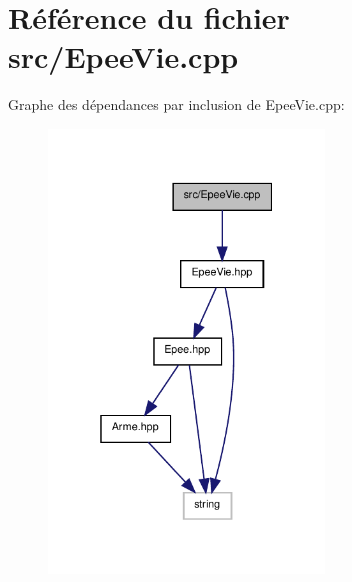 \section{Référence du fichier src/\-Epee\-Vie.cpp}
\label{_epee_vie_8cpp}
Graphe des dépendances par inclusion de Epee\-Vie.\-cpp\-:\nopagebreak
\begin{figure}[H]
\begin{center}
\leavevmode
\includegraphics[width=208pt]{_epee_vie_8cpp__incl}
\end{center}
\end{figure}

